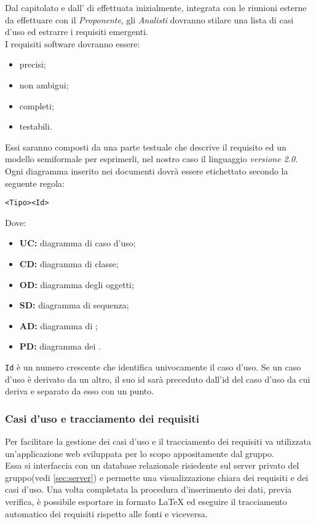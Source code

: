 \documentclass{scalatekids-article}
\begin{document}
Dal capitolato e dall' di  effettuata
inizialmente, integrata con le riunioni esterne da effettuare con il
\textit{Proponente}, gli \textit{Analisti} dovranno stilare una lista di casi
d'uso ed estrarre i requisiti emergenti.\\
I requisiti software dovranno essere:
\begin{itemize}
    \item precisi;
    \item non ambigui;
    \item completi;
    \item testabili.
\end{itemize}
Essi saranno composti da una parte testuale che descrive il requisito ed un
modello semiformale per esprimerli, nel nostro caso il linguaggio 
\textit{versione 2.0}. Ogni diagramma inserito nei documenti dovrà essere
etichettato secondo la seguente regola:
\begin{center}
    \verb=<Tipo><Id>=
\end{center}
Dove:
\begin{itemize}
    \item\textbf{UC:} diagramma di caso d'uso;
    \item\textbf{CD:} diagramma di classe;
    \item\textbf{OD:} diagramma degli oggetti;
    \item\textbf{SD:} diagramma di sequenza;
    \item\textbf{AD:} diagramma di ;
    \item\textbf{PD:} diagramma dei .
\end{itemize}
\verb=Id= è un numero crescente che identifica
univocamente il caso d'uso. Se un caso d'uso è derivato da un altro, il suo id
sarà preceduto dall'id del caso d'uso da cui deriva e separato da esso con un
punto.

\subsubsection{Casi d'uso e tracciamento dei requisiti}

\label{sec:front-end}
Per facilitare la gestione dei casi d'uso e il tracciamento dei requisiti
va utilizzata un'applicazione web sviluppata per lo scopo appositamente dal
gruppo.\\Essa si interfaccia con un database relazionale risiedente sul server
privato del gruppo(vedi \ref{sec:server}) e permette una visualizzazione chiara dei
requisiti e dei casi d'uso. Una volta completata la procedura d'inserimento dei
dati, previa verifica, è possibile esportare in formato
\LaTeX\xspace ed eseguire il tracciamento automatico dei requisiti rispetto alle
fonti e viceversa.
\end{document}
